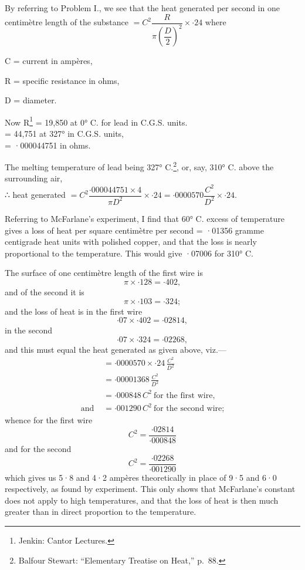 \documentclass[12pt,oneside]{book}[2021/10/04]
\begin{document}
By referring to Problem I., we see that the heat generated per
second in one centimètre length of the substance \(= C^2 \dfrac{R}{\pi \left(\dfrac{D}{2}\right)^2} \times ·24\) where
\begin{description}[leftmargin=1em]
\item[]C = current in ampères,
\item[]R = specific resistance in ohms,
\item[]D = diameter.
\end{description}
\vspace{1em}
Now R\footnote{Jenkin: Cantor Lectures.} = 19,850 at 0° C. for lead in C.G.S. units.\\
\phantom{Now R* }= 44,751 at 327° in C.G.S. units,\\
\phantom{Now R* }= ·000044751 in ohms.

\noindent
The melting temperature of lead being 327° C.\footnote
{Balfour Stewart: ``Elementary Treatise on Heat,'' p.\ 88.}, or, say, 310° C.
above the surrounding air,\\
∴ heat generated \(= C^2\dfrac{·000044751 \times 4}{\pi D^2} \times ·24 = ·0000570 \dfrac{C^2}{D^2} \times ·24\).

\vspace*{.4cm}
Referring to McFarlane's experiment, I find that 60° C. excess
of temperature gives a loss of heat per square centimètre per
second = ·01356 gramme centigrade heat units with polished
copper, and that the loss is nearly proportional to the temperature.
This would give ·07006 for 310° C.

The surface of one centimètre length of the first wire is
\[\pi \times ·128 = ·402,\]
and of the second it is
\[\pi \times ·103 = ·324;\]
and the loss of heat is in the first wire
\[·07 \times ·402 = ·02814,\]
in the second
\[·07 \times ·324 = ·02268,\]
and this must equal the heat generated as given above, viz.—
\begin{align*}
 &= ·0000570 \times ·24\,\frac{C^2}{D^2} \\
 &= ·00001368\,\frac{C^2}{D^2} \\
 &= ·000848\,C^2 \ \text{for the first wire,} \\
\text{and } &= ·001290\,C^2 \ \text{for the second wire;}
\end{align*}
whence for the first wire
\[C^2 = \frac{·02814}{·000848}\]
and for the second
\[C^2 = \frac{·02268}{·001290}\]
which gives us 5·8 and 4·2 ampères theoretically in place of
9·5 and 6·0 respectively, as found by experiment. This only shows
that McFarlane's constant does not apply to high temperatures,
and that the loss of heat is then much greater than in direct proportion
to the temperature.
\end{document}

